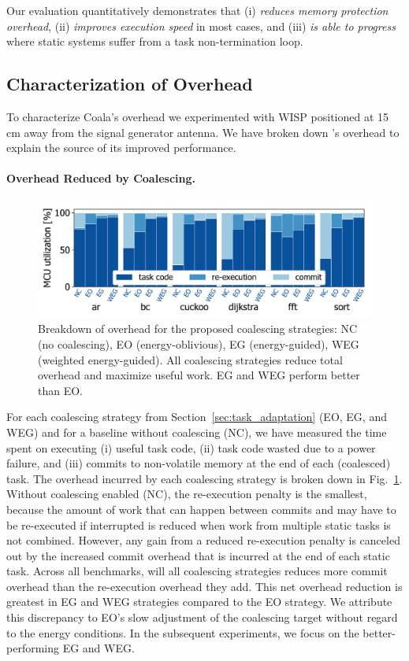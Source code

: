 Our evaluation quantitatively demonstrates that \sys (i) \emph{reduces memory
protection overhead}, (ii) \emph{improves execution speed} in most cases,
and (iii) \emph{is able to progress} where static systems suffer from a task non-termination loop. 
%
\subsection{Characterization of Overhead}
\label{sec:coala_overhead}

To characterize Coala's overhead we experimented with WISP positioned at
15\,cm away from the signal generator antenna.
We have broken down \sys's overhead to explain the source of its improved performance.

\paragraph{Overhead Reduced by Coalescing.}
\label{sec:overhead-coalescing}

\begin{figure}
    \centering
    \includegraphics[width=.8\columnwidth]{figures/coalEfficiency}
    \caption{Breakdown of overhead for the proposed coalescing strategies:
    NC (no coalescing), EO (energy-oblivious), EG (energy-guided), WEG
    (weighted energy-guided). All coalescing strategies reduce total
    overhead and maximize useful work. EG and WEG perform better than EO.}
    \label{fig:overallOverheadBreakdown}
\end{figure}

For each coalescing strategy from Section~\ref{sec:task_adaptation} (EO, EG,
and WEG) and for a baseline without coalescing (NC), we have measured the time
spent on executing (i) useful task code, (ii) task code wasted due to a power failure, and
(iii) commits to non-volatile memory at the end of each (coalesced)
task.
%
The overhead incurred by each coalescing strategy is broken down in
Fig.~\ref{fig:overallOverheadBreakdown}. Without coalescing enabled (NC), the
re-execution penalty is the smallest, because the amount of work that can happen
between commits and may have to be re-executed if interrupted is reduced when
work from multiple static tasks is not combined.
%
However, any gain from a reduced re-execution penalty is canceled out by
the increased commit overhead that is incurred at the end of each static
task.
%
Across all benchmarks, will all coalescing strategies \sys reduces more commit overhead
than the re-execution overhead they add.
%
This net overhead reduction is greatest in EG and WEG strategies compared
to the EO strategy. We attribute this discrepancy to EO's slow adjustment
of the coalescing target without regard to the energy conditions.
%
In the subsequent experiments, we focus on the better-performing EG and WEG.

